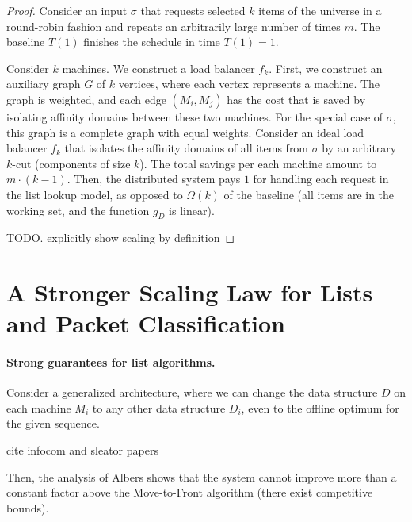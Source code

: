 \begin{proof}
	Consider an input $\sigma$ that requests selected $k$ items of the universe in a round-robin fashion and repeats an arbitrarily large number of times $m$.
	The baseline $T(1)$ finishes the schedule in time $T(1) = 1$.

Consider $k$ machines. We construct a load balancer $f_k$.
First, we construct an auxiliary graph $G$ of $k$ vertices, where each vertex represents a machine. The graph is weighted, and each edge $(M_i, M_j)$ has the cost that is saved by isolating affinity domains between these two machines. For the special case of $\sigma$, this graph is a complete graph with equal weights.
Consider an ideal load balancer $f_k$ that isolates the affinity domains of all items from $\sigma$ by an arbitrary $k$-cut (components of size $k$)\cite{Frieze97, Mahajan95}. The total savings per each machine amount to $m\cdot(k-1)$.
Then, the distributed system pays $1$ for handling each request in the list lookup model, as opposed to $\Omega(k)$ of the baseline (all items are in the working set, and the function $g_D$ is linear).


TODO. explicitly show scaling by definition







\end{proof}

\section{A Stronger Scaling Law for Lists and Packet Classification}

\paragraph*{Strong guarantees for list algorithms.}
Consider a generalized architecture, where we can change the data structure $D$ on each machine $M_i$ to any other data structure $D_i$, even to the offline optimum for the given sequence. 

cite infocom and sleator papers


Then, the analysis of Albers shows that the system cannot improve more than a constant factor above the Move-to-Front algorithm (there exist competitive bounds).



